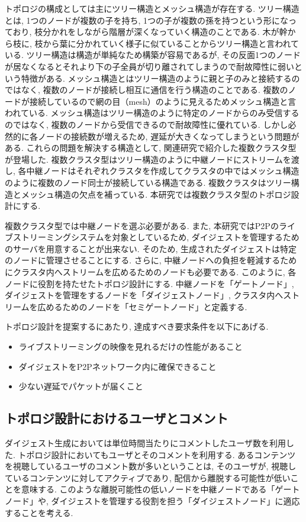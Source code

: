 トポロジの構成としては主にツリー構造とメッシュ構造が存在する. ツリー構造とは, 1つのノードが複数の子を持ち, 1つの子が複数の孫を持つという形になっており, 枝分かれをしながら階層が深くなっていく構造のことである. 木が幹から枝に, 枝から葉に分かれていく様子に似ていることからツリー構造と言われている. ツリー構造は構造が単純なため構築が容易であるが, その反面1つのノードが居なくなるとそれより下の子全員が切り離されてしまうので耐故障性に弱いという特徴がある. メッシュ構造とはツリー構造のように親と子のみと接続するのではなく, 複数のノードが接続し相互に通信を行う構造のことである. 複数のノードが接続しているので網の目（mesh）のように見えるためメッシュ構造と言われている. メッシュ構造はツリー構造のように特定のノードからのみ受信するのではなく, 複数のノードから受信できるので耐故障性に優れている. しかし必然的に各ノードの接続数が増えるため, 遅延が大きくなってしまうという問題がある. これらの問題を解決する構造として, 関連研究で紹介した複数クラスタ型が登場した. 複数クラスタ型はツリー構造のように中継ノードにストリームを渡し, 各中継ノードはそれぞれクラスタを作成してクラスタの中ではメッシュ構造のように複数のノード同士が接続している構造である. 複数クラスタはツリー構造とメッシュ構造の欠点を補っている. 本研究では複数クラスタ型のトポロジ設計にする.

複数クラスタ型では中継ノードを選ぶ必要がある. また, 本研究ではP2Pのライブストリーミングシステムを対象としているため, ダイジェストを管理するためのサーバを用意することが出来ない. そのため, 生成されたダイジェストは特定のノードに管理させることにする. さらに, 中継ノードへの負担を軽減するためにクラスタ内へストリームを広めるためのノードも必要である. このように, 各ノードに役割を持たせたトポロジ設計にする. 中継ノードを「ゲートノード」, ダイジェストを管理をするノードを「ダイジェストノード」, クラスタ内へストリームを広めるためのノードを「セミゲートノード」と定義する.

トポロジ設計を提案するにあたり, 達成すべき要求条件を以下にあげる.

\begin{itemize}
\item ライブストリーミングの映像を見れるだけの性能があること
\item ダイジェストをP2Pネットワーク内に確保できること
\item 少ない遅延でパケットが届くこと
\end{itemize}


\subsection{トポロジ設計におけるユーザとコメント}
ダイジェスト生成においては単位時間当たりにコメントしたユーザ数を利用した. トポロジ設計においてもユーザとそのコメントを利用する. あるコンテンツを視聴しているユーザのコメント数が多いということは, そのユーザが, 視聴しているコンテンツに対してアクティブであり, 配信から離脱する可能性が低いことを意味する. このような離脱可能性の低いノードを中継ノードである「ゲートノード」や, ダイジェストを管理する役割を担う「ダイジェストノード」に適応することを考える.

